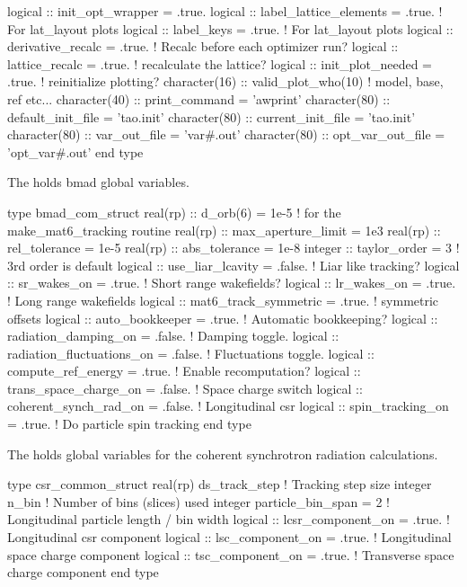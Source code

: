 \begin{example}
  logical :: init_opt_wrapper = .true.
  logical :: label_lattice_elements = .true. ! For lat_layout plots
  logical :: label_keys = .true.             ! For lat_layout plots
  logical :: derivative_recalc = .true.      ! Recalc before each optimizer run?
  logical :: lattice_recalc = .true.         ! recalculate the lattice?
  logical :: init_plot_needed = .true.       ! reinitialize plotting?
  character(16) :: valid_plot_who(10)        ! model, base, ref etc...
  character(40) :: print_command = 'awprint'
  character(80) :: default_init_file = 'tao.init'
  character(80) :: current_init_file = 'tao.init'
  character(80) :: var_out_file = 'var#.out'
  character(80) :: opt_var_out_file = 'opt_var#.out'
end type
\end{example}

The  holds bmad global variables. 
\begin{example}
  type bmad_com_struct
    real(rp) :: d_orb(6) = 1e-5  ! for the make_mat6_tracking routine
    real(rp) :: max_aperture_limit = 1e3    
    real(rp) :: rel_tolerance = 1e-5
    real(rp) :: abs_tolerance = 1e-8
    integer :: taylor_order = 3              ! 3rd order is default
    logical :: use_liar_lcavity = .false.    ! Liar like tracking?
    logical :: sr_wakes_on = .true.          ! Short range wakefields?
    logical :: lr_wakes_on = .true.          ! Long range wakefields
    logical :: mat6_track_symmetric = .true. ! symmetric offsets
    logical :: auto_bookkeeper = .true.      ! Automatic bookkeeping?
    logical :: radiation_damping_on = .false.       ! Damping toggle.
    logical :: radiation_fluctuations_on = .false.  ! Fluctuations toggle.
    logical :: compute_ref_energy = .true.          ! Enable recomputation?
    logical :: trans_space_charge_on = .false.      ! Space charge switch
    logical :: coherent_synch_rad_on = .false.      ! Longitudinal csr 
    logical :: spin_tracking_on = .true.            ! Do particle spin tracking
  end type
\end{example}

The  holds global variables for the coherent
synchrotron radiation calculations.
\begin{example}
  type csr_common_struct
    real(rp) ds_track_step                   ! Tracking step size
    integer n_bin                            ! Number of bins (slices) used
    integer particle_bin_span = 2            ! Longitudinal particle length / bin width
    logical :: lcsr_component_on = .true.    ! Longitudinal csr component
    logical :: lsc_component_on = .true.     ! Longitudinal space charge component
    logical :: tsc_component_on = .true.     ! Transverse space charge component
  end type
\end{example}


